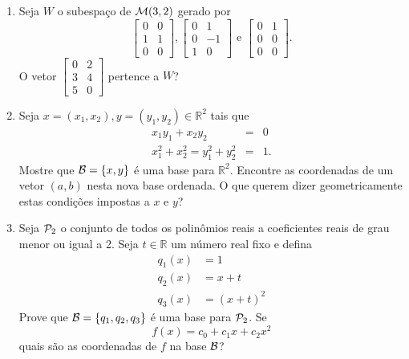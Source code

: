 \documentclass[12pt]{article}
\begin{document}
\begin{enumerate}
\item Seja $W$ o subespaço de ${\cal{M}}(3,2)$ gerado por
  \begin{equation*}
    \begin{bmatrix}
      0& 0\\
      1 & 1\\
      0 & 0
    \end{bmatrix},
    \begin{bmatrix}
      0 & 1\\
      0 & -1\\
      1 & 0
    \end{bmatrix}
    \text{ e }
    \begin{bmatrix}
      0 & 1\\
      0 & 0\\
      0 & 0
    \end{bmatrix}.     
  \end{equation*}
  O vetor $
  \begin{bmatrix}
    0 & 2\\
    3 & 4\\
    5 & 0
  \end{bmatrix}$ pertence a $W$?
  
\item Seja $x = (x_1,x_2), y = (y_1,y_2) \in {\mathbb{R}}^2$ tais que
  \begin{align*}
    x_1y_1 + x_2y_2 &=& 0\\
    x_1^2+x_2^2=y_1^2+y_2^2&=&1.
  \end{align*}
  Mostre que ${\cal{B}} = \{x,y\}$ é uma base para ${\mathbb{R}}^2$. Encontre as coordenadas de um vetor $(a,b)$ nesta nova base ordenada. O que querem dizer geometricamente estas condições impostas a $x$ e $y$?
%
\item Seja ${\cal{P}}_2$ o conjunto de todos os polinômios reais a coeficientes reais de grau menor ou igual a 2. Seja $t\in \mathbb{R}$ um número real fixo e defina 
  \begin{align*}
    q_1(x) &= 1\\
    q_2(x) &= x+t\\
    q_3(x) &= (x+t)^2
  \end{align*}
  Prove que ${\cal{B}} = \{q_1,q_2,q_3\}$ é uma base para ${\cal{P}}_2$. Se
  $$f(x) = c_0 + c_1x+c_2x^2$$
  quais são as coordenadas de $f$ na base ${\cal{B}}$?
  

\end{enumerate}
\end{document}
